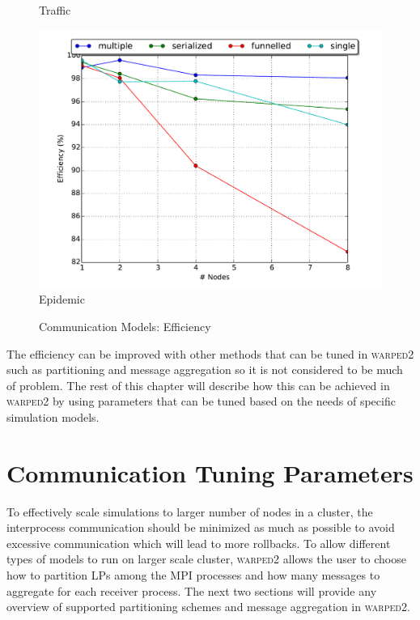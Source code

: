 \documentclass[11pt]{book}
\begin{document}
\begin{figure}
\begin{minipage}{.5\textwidth}
\begin{center}
      Traffic \\
    \end{center}
  \end{minipage}
  \centering
  \begin{minipage}{.5\textwidth}
    \begin{center}
      \includegraphics[width=\textwidth,keepaspectratio,quiet]{figs/partitioning_communication/communication_epidemic_efficiency.pdf} \\
      Epidemic \\
    \end{center}
  \end{minipage}
  \caption{Communication Models: Efficiency}\label{communication_model_efficiency}
\end{figure}

The efficiency can be improved with other methods that can be tuned in \textsc{warped2} such as
partitioning and message aggregation so it is not considered to be much of problem.  The rest of
this chapter will describe how this can be achieved in \textsc{warped2} by using parameters that can
be tuned based on the needs of specific simulation models.

\section{Communication Tuning Parameters}

To effectively scale simulations to larger number of nodes in a cluster, the interprocess
communication should be minimized as much as possible to avoid excessive communication which will
lead to more rollbacks.  To allow different types of models to run on larger scale cluster,
\textsc{warped2} allows the user to choose how to partition LPs among the MPI processes and how many
messages to aggregate for each receiver process.  The next two sections will provide any overview of
supported partitioning schemes and message aggregation in \textsc{warped2}.
\end{document}
